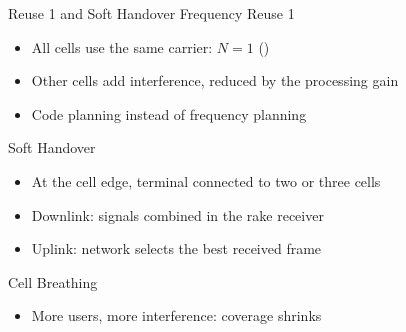 \begin{frame}{Reuse 1 and Soft Handover}
  Frequency Reuse 1
  \begin{itemize}
    \item All cells use the same carrier: $N = 1$ ()
    \item Other cells add interference, reduced by the processing gain
    \item Code planning instead of frequency planning
  \end{itemize}
  \vspace{0.4em}
  Soft Handover
  \begin{itemize}
    \item At the cell edge, terminal connected to two or three cells
    \item Downlink: signals combined in the rake receiver
    \item Uplink: network selects the best received frame
  \end{itemize}
  \vspace{0.4em}
  Cell Breathing
  \begin{itemize}
    \item More users, more interference: coverage shrinks
  \end{itemize}
\end{frame}



